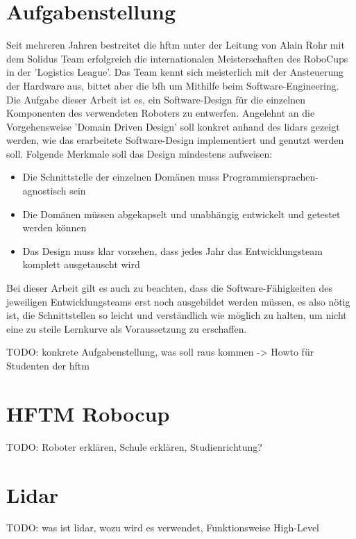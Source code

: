 \documentclass[11pt,english,german]{report}
\begin{document}
\section{Aufgabenstellung}
Seit mehreren Jahren bestreitet die \acrshort{hftm} unter der Leitung von Alain Rohr mit dem Solidus Team erfolgreich die internationalen Meisterschaften des RoboCups in der 'Logistics League'.
Das Team kennt sich meisterlich mit der Ansteuerung der Hardware aus, bittet aber die \acrshort{bfh} um Mithilfe beim Software-Engineering.
Die Aufgabe dieser Arbeit ist es, ein Software-Design für die einzelnen Komponenten des verwendeten Roboters zu entwerfen. Angelehnt an die Vorgehensweise 'Domain Driven Design' soll konkret anhand des \acrshort{lidar}s gezeigt werden, wie das erarbeitete Software-Design implementiert und genutzt werden soll. Folgende Merkmale soll das Design mindestens aufweisen:

\begin{itemize}
	\item
	Die Schnittstelle der einzelnen Domänen muss Programmiersprachen-agnostisch sein
	
	\item
	Die Domänen müssen abgekapselt und unabhängig entwickelt und getestet werden können
	
	\item
	Das Design muss klar vorsehen, dass jedes Jahr das Entwicklungsteam komplett ausgetauscht wird
\end{itemize}
Bei dieser Arbeit gilt es auch zu beachten, dass die Software-Fähigkeiten des jeweiligen Entwicklungsteams erst noch ausgebildet werden müssen, es also nötig ist, die Schnittstellen so leicht und verständlich wie möglich zu halten, um nicht eine zu steile Lernkurve als Voraussetzung zu erschaffen.


\bigskip
TODO:
konkrete Aufgabenstellung, was soll raus kommen -> Howto für Studenten der \acrshort{hftm}

\section{HFTM Robocup}
TODO:
Roboter erklären, Schule erklären, Studienrichtung?

\section{Lidar}
TODO:
was ist \acrshort{lidar}, wozu wird es verwendet, Funktionsweise High-Level
\end{document}
